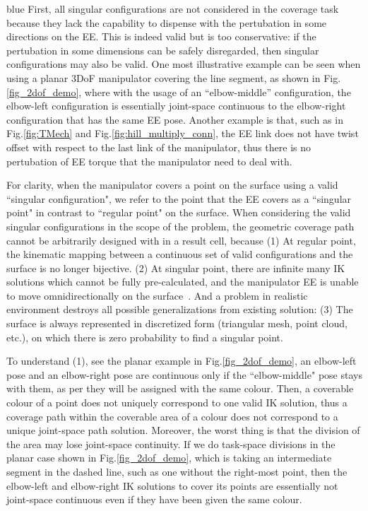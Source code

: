 \documentclass[Afour,sageh,times]{sagej}
\begin{document}
\begin{color}{blue}
First, all singular configurations are not considered in the coverage task because they lack the capability to dispense with the pertubation in some directions on the EE. This is indeed valid but is too conservative: if the pertubation in some dimensions can be safely disregarded, then singular configurations may also be valid. One most illustrative example can be seen when using a planar 3DoF manipulator covering the line segment, as shown in Fig.\ref{fig_2dof_demo}, where with the usage of an ``elbow-middle'' configuration, the elbow-left configuration is essentially joint-space continuous to the elbow-right configuration that has the same EE pose. 
Another example is that, such as in Fig.\ref{fig:TMech} and Fig.\ref{fig:hill_multiply_conn}, the EE link does not have twist offset with respect to the last link of the manipulator, thus there is no pertubation of EE torque that the manipulator need to deal with. 

For clarity, when the manipulator covers a point on the surface using a valid ``singular configuration", we refer to the point that the EE covers as a ``singular point" in contrast to ``regular point" on the surface. 
When considering the valid singular configurations in the scope of the problem, the geometric coverage path cannot be arbitrarily designed with in a result cell, because (1) At regular point, the kinematic mapping between a continuous set of valid configurations and the surface is no longer bijective. (2) At singular point, there are infinite many IK solutions which cannot be fully pre-calculated, and the manipulator EE is unable to move omnidirectionally on the surface~\cite{Egeland1991Manipulator}. And a problem in realistic environment destroys all possible generalizations from existing solution: (3) The surface is always represented in discretized form (triangular mesh, point cloud, etc.), on which there is zero probability to find a singular point. 

To understand (1), see the planar example in Fig.\ref{fig_2dof_demo}, an elbow-left pose and an elbow-right pose are continuous only if the ``elbow-middle" pose stays with them, as per they will be assigned with the same colour. Then, a coverable colour of a point does not uniquely correspond to one valid IK solution, thus a coverage path within the coverable area of a colour does not correspond to a unique joint-space path solution. 
Moreover, the worst thing is that the division of the area may lose joint-space continuity. 
If we do task-space divisions in the planar case shown in Fig.\ref{fig_2dof_demo}, which is taking an intermediate segment in the dashed line, such as one without the right-most point, then the elbow-left and elbow-right IK solutions to cover its points are essentially not joint-space continuous even if they have been given the same colour. 


\end{color}
\end{document}
